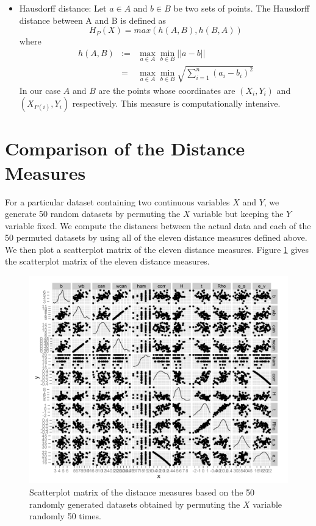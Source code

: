 \begin{itemize}
\item Hausdorff distance: Let $a \in A$ and $b \in B$ be two sets of points. The Hausdorff distance between A and B is defined as
 \[
H_P(X)  = max (h(A, B), h(B, A))
\]
where 
\begin{eqnarray*}
h(A, B) &:=& \max_{a \in A} \min_{b \in B} ||a - b|| \\ & = & \max_{a \in A} \min_{b \in B} \sqrt{\sum_{i=1}^n (a_i - b_i)^2}
\end{eqnarray*}
In our case $A$ and $B$ are the points whose coordinates are $(X_i, Y_i)$ and $(X_{P(i)}, Y_i)$ respectively. This measure is computationally intensive.

\end{itemize}


\section{Comparison of the Distance Measures}

For a particular dataset containing two continuous variables $X$ and $Y$, we generate 50 random datasets by permuting the $X$ variable but keeping the $Y$ variable fixed. We compute the distances between the actual data and each of the 50 permuted datasets by using all of the eleven distance measures defined above. We then plot a scatterplot matrix of the eleven distance measures. Figure \ref{scamat} gives the scatterplot matrix of the eleven distance measures.

\begin{figure}[htbp]
   \centering
       \includegraphics[width=5in]{sca_plot_matrix.pdf}
	\vspace{-.2in}
       \caption{Scatterplot matrix of the distance measures based on the 50 randomly generated datasets obtained by permuting the $X$ variable randomly 50 times.}
       \label{scamat}
\end{figure}

